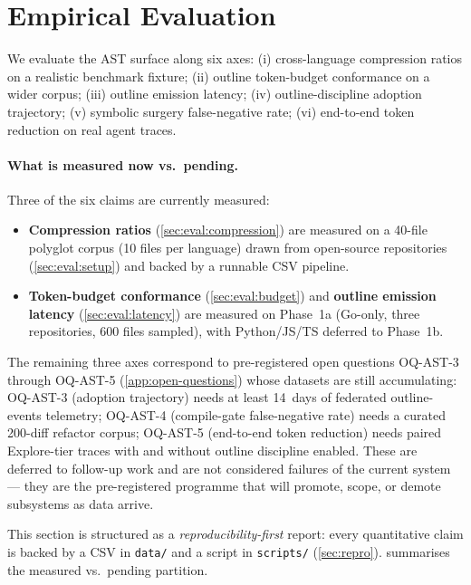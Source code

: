 \section{Empirical Evaluation}
\label{sec:eval}

We evaluate the AST surface along six axes: (i) cross-language
compression ratios on a realistic benchmark fixture; (ii) outline
token-budget conformance on a wider corpus; (iii) outline emission
latency; (iv) outline-discipline adoption trajectory; (v) symbolic
surgery false-negative rate; (vi) end-to-end token reduction on real
agent traces.

\paragraph{What is measured now vs.\ pending.}
Three of the six claims are currently measured:
\begin{itemize}[leftmargin=*,nosep]
  \item \textbf{Compression ratios} (\cref{sec:eval:compression}) are
        measured on a 40-file polyglot corpus (10 files per language)
        drawn from open-source repositories (\cref{sec:eval:setup}) and
        backed by a runnable CSV pipeline.
  \item \textbf{Token-budget conformance} (\cref{sec:eval:budget}) and
        \textbf{outline emission latency} (\cref{sec:eval:latency}) are
        measured on Phase~1a (Go-only, three repositories, 600 files
        sampled), with Python/JS/TS deferred to Phase~1b.
\end{itemize}
The remaining three axes correspond to pre-registered open questions
OQ-AST-3 through OQ-AST-5 (\cref{app:open-questions}) whose datasets
are still accumulating:
OQ-AST-3 (adoption trajectory) needs at least 14~days of federated
outline-events telemetry;
OQ-AST-4 (compile-gate false-negative rate) needs a curated 200-diff
refactor corpus;
OQ-AST-5 (end-to-end token reduction) needs paired Explore-tier
traces with and without outline discipline enabled.
These are deferred to follow-up work and are not considered failures
of the current system --- they are the pre-registered programme that
will promote, scope, or demote subsystems as data arrive.

This section is structured as a \emph{reproducibility-first} report:
every quantitative claim is backed by a CSV in \texttt{data/} and a
script in \texttt{scripts/} (\cref{sec:repro}).
 summarises the measured vs.\ pending partition.

